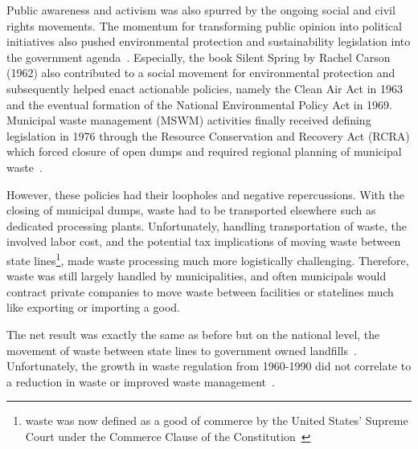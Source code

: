 \documentclass[../main/main]{subfiles}
\begin{document}
Public awareness and activism was also spurred by the ongoing social and civil rights movements. The momentum for transforming public opinion into political initiatives also pushed environmental protection and sustainability legislation into the government agenda~\cite{cutter1995}. Especially, the book Silent Spring by Rachel Carson (1962) also contributed to a social movement for environmental protection and subsequently helped enact actionable policies, namely the Clean Air Act in 1963 and the eventual formation of the National Environmental Policy Act in 1969. Municipal waste management (MSWM) activities finally received defining legislation in 1976 through the Resource Conservation and Recovery Act (RCRA) which forced closure of open dumps and required regional planning of municipal waste~\cite{louis2004}.

However, these policies had their loopholes and negative repercussions. With the closing of municipal dumps, waste had to be transported elsewhere such as dedicated processing plants. Unfortunately, handling transportation of waste, the involved labor cost, and the potential tax implications of moving waste between state lines\footnote{
	waste was now defined as a good of commerce by the United States' Supreme Court under the Commerce Clause of the Constitution~\cite{louis2004}
}, made waste processing much more logistically challenging. Therefore, waste was still largely handled by municipalities, and often municipals would contract private companies to move waste between facilities or statelines much like exporting or importing a good.

The net result was exactly the same as before but on the national level, the movement of waste between state lines to government owned landfills~\cite{elliott2013}. Unfortunately, the growth in waste regulation from 1960-1990 did not correlate to a reduction in waste or improved waste management~\cite{andrews2018}.
\end{document}
